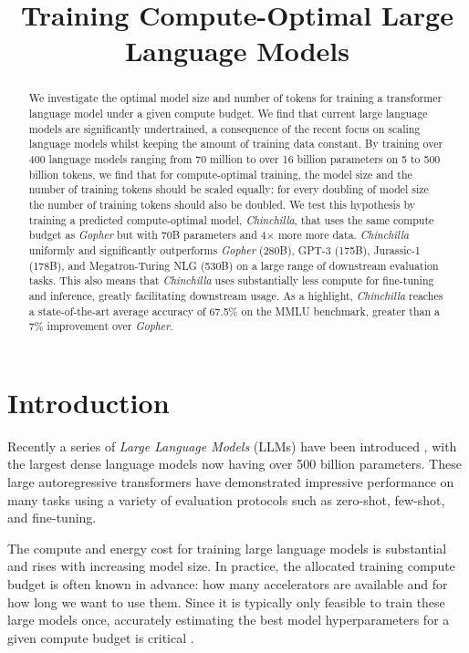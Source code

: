 \title{Training Compute-Optimal Large Language Models}

\begin{abstract}
We investigate the optimal model size and number of tokens for training a transformer language model under a given compute budget. We find that current large language models are significantly undertrained, a consequence of the recent focus on scaling language models whilst keeping the amount of training data constant. By training over 400  language models ranging from 70 million to over 16 billion parameters on 5 to 500 billion tokens, we find that for compute-optimal training, the model size and the number of training tokens should be scaled equally: for every doubling of model size the number of training tokens should also be doubled. We test this hypothesis by training a predicted compute-optimal model, \textit{Chinchilla}, that uses the same compute budget as \textit{Gopher} but with 70B parameters and 4$\times$ more more data.
\textit{Chinchilla} uniformly and significantly outperforms \textit{Gopher} (280B), GPT-3 (175B), Jurassic-1 (178B), and Megatron-Turing NLG (530B) on a large range of downstream evaluation tasks. This also means that \textit{Chinchilla} uses substantially less compute for fine-tuning and inference, greatly facilitating downstream usage. As a highlight, \textit{Chinchilla} reaches a state-of-the-art average accuracy of 67.5\% on the MMLU benchmark, greater than a 7\% improvement over \textit{Gopher}.
\end{abstract}

\section{Introduction}
Recently a series of \textit{Large Language Models} (LLMs) have been introduced \citep{gpt3, jurassic, rae2021gopher, nlg530b, thoppilan2022lamda}, with the largest dense language models now having over 500 billion parameters. These large autoregressive transformers \citep{vaswani2017attention} have demonstrated impressive performance on many tasks using a variety of evaluation protocols such as zero-shot, few-shot, and fine-tuning.

The compute and energy cost for training large language models is substantial \citep{rae2021gopher, thoppilan2022lamda} and rises with increasing model size. In practice, the allocated training compute budget is often known in advance: how many accelerators are available and for how long we want to use them. Since it is typically only feasible to train these large models once, accurately estimating the best model hyperparameters for a given compute budget is critical \citep{tay2021scale}.

